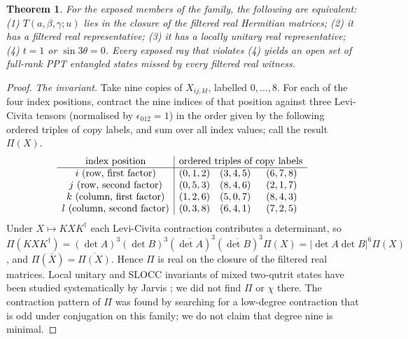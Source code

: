 \documentclass[11pt,a4paper]{article}
\newtheorem{theorem}{Theorem}\newtheorem{lemma}[theorem]{Lemma}\newtheorem{prop}[theorem]{Proposition}\newtheorem{cor}[theorem]{Corollary}
\theoremstyle{definition}\newtheorem{definition}[theorem]{Definition}\newtheorem*{conj}{Conjecture 9 of Shen, Chen and Bian}\newtheorem{remark}[theorem]{Remark}
\begin{document}
\begin{theorem}\label{thm:class}
For the exposed members of the family, the following are equivalent: (1) $T(a,\beta,\gamma;u)$ lies in the closure of the filtered real Hermitian matrices; (2) it has a filtered real representative; (3) it has a locally unitary real representative; (4) $t=1$ or $\sin3\theta=0$. Every exposed ray that violates (4) yields an open set of full-rank PPT entangled states missed by every filtered real witness.
\end{theorem}
\begin{proof}
\emph{The invariant.} Take nine copies of $X_{ij,kl}$, labelled $0,\dots,8$. For each of the four index positions, contract the nine indices of that position against three Levi-Civita tensors (normalised by $\epsilon_{012}=1$) in the order given by the following ordered triples of copy labels, and sum over all index values; call the result $\Pi(X)$.
\[
\begin{array}{c|ccc}
\text{index position}&\multicolumn{3}{c}{\text{ordered triples of copy labels}}\\ \hline
 i\ (\text{row, first factor})&(0,1,2)&(3,4,5)&(6,7,8)\\
 j\ (\text{row, second factor})&(0,5,3)&(8,4,6)&(2,1,7)\\
 k\ (\text{column, first factor})&(1,2,6)&(5,0,7)&(8,4,3)\\
 l\ (\text{column, second factor})&(0,3,8)&(6,4,1)&(7,2,5)
\end{array}
\]
Under $X\mapsto KXK^\dagger$ each Levi-Civita contraction contributes a determinant, so $\Pi(KXK^\dagger)=(\det A)^3(\det B)^3(\overline{\det A})^3(\overline{\det B})^3\Pi(X)=|\det A\det B|^6\Pi(X)$, and $\Pi(\bar X)=\overline{\Pi(X)}$. Hence $\Pi$ is real on the closure of the filtered real matrices. Local unitary and SLOCC invariants of mixed two-qutrit states have been studied systematically by Jarvis \cite{jarvis}; we did not find $\Pi$ or $\chi$ there. The contraction pattern of $\Pi$ was found by searching for a low-degree contraction that is odd under conjugation on this family; we do not claim that degree nine is minimal.


\end{proof}
\end{document}
